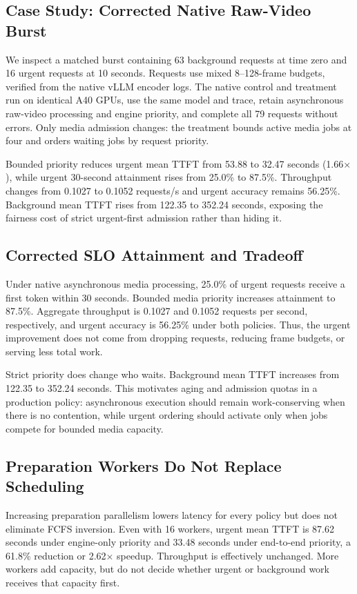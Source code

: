 \documentclass[sigconf,review,anonymous]{acmart}
\begin{document}
\subsection{Case Study: Corrected Native Raw-Video Burst}

We inspect a matched burst containing 63 background requests at time zero and
16 urgent requests at 10 seconds. Requests use mixed 8--128-frame budgets,
verified from the native vLLM encoder logs. The native control and treatment
run on identical A40 GPUs, use the same model and trace, retain asynchronous
raw-video processing and engine priority, and complete all 79 requests without
errors. Only media admission changes: the treatment bounds active media jobs
at four and orders waiting jobs by request priority.

Bounded priority reduces urgent mean TTFT from 53.88 to 32.47 seconds
(1.66$\times$), while urgent 30-second attainment rises from 25.0\% to 87.5\%.
Throughput changes from 0.1027 to 0.1052 requests/s and urgent accuracy remains
56.25\%. Background mean TTFT rises from 122.35 to 352.24 seconds, exposing the
fairness cost of strict urgent-first admission rather than hiding it.

\subsection{Corrected SLO Attainment and Tradeoff}

Under native asynchronous media processing, 25.0\% of urgent requests receive
a first token within 30 seconds. Bounded media priority increases attainment
to 87.5\%. Aggregate throughput is 0.1027 and 0.1052 requests per second,
respectively, and urgent accuracy is 56.25\% under both policies. Thus, the
urgent improvement does not come from dropping requests, reducing frame
budgets, or serving less total work.

Strict priority does change who waits. Background mean TTFT increases from
122.35 to 352.24 seconds. This motivates aging and admission quotas in a
production policy: asynchronous execution should remain work-conserving when
there is no contention, while urgent ordering should activate only when jobs
compete for bounded media capacity.

\subsection{Preparation Workers Do Not Replace Scheduling}

Increasing preparation parallelism lowers latency for every policy but does
not eliminate FCFS inversion. Even with 16 workers, urgent mean TTFT is 87.62
seconds under engine-only priority and 33.48 seconds under end-to-end
priority, a 61.8\% reduction or 2.62$\times$ speedup. Throughput is effectively
unchanged. More workers add capacity, but do not decide whether urgent or
background work receives that capacity first.
\end{document}
